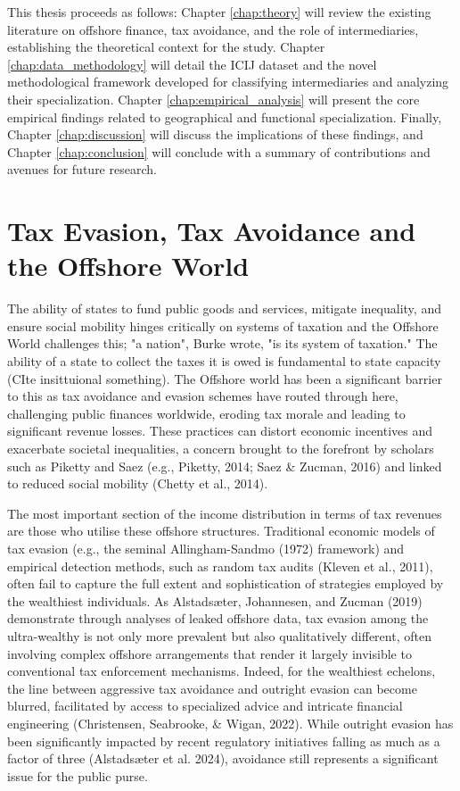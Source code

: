 This thesis proceeds as follows: Chapter \ref{chap:theory} will review the existing literature on offshore finance, tax avoidance, and the role of intermediaries, establishing the theoretical context for the study. Chapter \ref{chap:data_methodology} will detail the ICIJ dataset and the novel methodological framework developed for classifying intermediaries and analyzing their specialization. Chapter \ref{chap:empirical_analysis} will present the core empirical findings related to geographical and functional specialization. Finally, Chapter \ref{chap:discussion} will discuss the implications of these findings, and Chapter \ref{chap:conclusion} will conclude with a summary of contributions and avenues for future research.

\section{Tax Evasion, Tax Avoidance and the Offshore World}
\label{sec:1_1}

The ability of states to fund public goods and services, mitigate inequality, and ensure social mobility hinges critically on systems of taxation and the Offshore World challenges this; "a nation", Burke wrote, "is its system of taxation." The ability of a state to collect the taxes it is owed is fundamental to state capacity (CIte insittuional something). The Offshore world has been a significant barrier to this as tax avoidance and evasion schemes have routed through here, challenging public finances worldwide, eroding tax morale and leading to significant revenue losses. These practices can distort economic incentives and exacerbate societal inequalities, a concern brought to the forefront by scholars such as Piketty and Saez (e.g., Piketty, 2014; Saez \& Zucman, 2016) and linked to reduced social mobility (Chetty et al., 2014).

The most important section of the income distribution in terms of tax revenues are those who utilise these offshore structures. Traditional economic models of tax evasion (e.g., the seminal Allingham-Sandmo (1972) framework) and empirical detection methods, such as random tax audits (Kleven et al., 2011), often fail to capture the full extent and sophistication of strategies employed by the wealthiest individuals. As Alstadsæter, Johannesen, and Zucman (2019) demonstrate through analyses of leaked offshore data, tax evasion among the ultra-wealthy is not only more prevalent but also qualitatively different, often involving complex offshore arrangements that render it largely invisible to conventional tax enforcement mechanisms. Indeed, for the wealthiest echelons, the line between aggressive tax avoidance and outright evasion can become blurred, facilitated by access to specialized advice and intricate financial engineering (Christensen, Seabrooke, \& Wigan, 2022). While outright evasion has been significantly impacted by recent regulatory initiatives falling as much as a factor of three (Alstadsæter et al. 2024), avoidance still represents a significant issue for the public purse.

